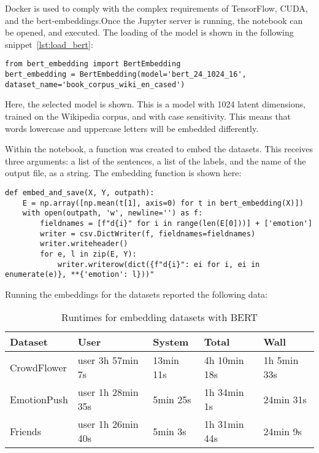 Docker is used to comply with the complex requirements of TensorFlow, CUDA, and the bert-embeddings.Once the Jupyter server is running, the notebook can be opened, and executed. The loading of the model is shown in the following snippet~\ref{lst:load_bert}:

\begin{lstlisting}[caption={Loading BERT},label=lst:load_bert,frame=single]
from bert_embedding import BertEmbedding
bert_embedding = BertEmbedding(model='bert_24_1024_16', dataset_name='book_corpus_wiki_en_cased')
\end{lstlisting}

Here, the selected model is shown. This is a model with 1024 latent dimensions, trained on the Wikipedia corpus, and with case sensitivity. This means that words lowercase and uppercase letters will be embedded differently.

Within the notebook, a function was created to embed the datasets. This receives three arguments: a list of the sentences, a list of the labels, and the name of the output file, as a string. The embedding function is shown here:

\begin{lstlisting}[caption={Embedding with BERT},label=lst:embed_bert,frame=single]
def embed_and_save(X, Y, outpath):
    E = np.array([np.mean(t[1], axis=0) for t in bert_embedding(X)])
    with open(outpath, 'w', newline='') as f:
        fieldnames = [f"d{i}" for i in range(len(E[0]))] + ['emotion']
        writer = csv.DictWriter(f, fieldnames=fieldnames)
        writer.writeheader()
        for e, l in zip(E, Y):
            writer.writerow(dict({f"d{i}": ei for i, ei in enumerate(e)}, **{'emotion': l}))"
\end{lstlisting}

Running the embeddings for the datasets reported the following data:

\begin{table}[H]
  \begin{tabular}{lllll}
  Dataset                          & User              & System    & Total        & Wall        \\
  \hline
  \multicolumn{1}{l|}{CrowdFlower} & user 3h 57min 7s  & 13min 11s & 4h 10min 18s & 1h 5min 33s \\
  \multicolumn{1}{l|}{EmotionPush} & user 1h 28min 35s & 5min 25s  & 1h 34min 1s &  24min 31s   \\
  \multicolumn{1}{l|}{Friends    } & user 1h 26min 40s & 5min 3s   & 1h 31min 44s & 24min 9s
  \end{tabular}
  \caption{Runtimes for embedding datasets with BERT}\label{tab:rt_BERT}
\end{table}

